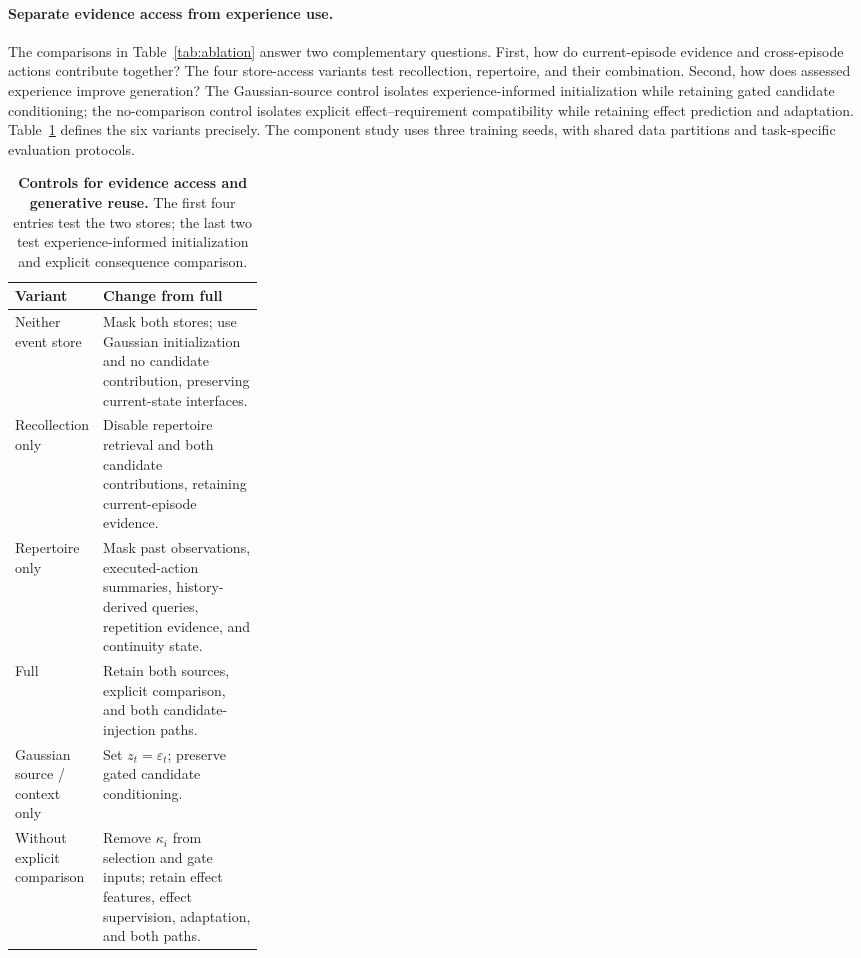 \paragraph{Separate evidence access from experience use.}
The comparisons in Table~\ref{tab:ablation} answer two complementary questions.
First, how do current-episode evidence and cross-episode actions contribute together?
The four store-access variants test recollection, repertoire, and their combination.
Second, how does assessed experience improve generation?
The Gaussian-source control isolates experience-informed initialization while retaining gated candidate conditioning; the no-comparison control isolates explicit effect--requirement compatibility while retaining effect prediction and adaptation.
Table~\ref{tab:app_ablation_defs} defines the six variants precisely.
The component study uses three training seeds, with shared data partitions and task-specific evaluation protocols.

\begin{table}[!htbp]
\centering\small
\caption{\textbf{Controls for evidence access and generative reuse.} The first four entries test the two stores; the last two test experience-informed initialization and explicit consequence comparison.}
\label{tab:app_ablation_defs}
\begin{tabularx}{\linewidth}{@{}p{0.29\linewidth}X@{}}
\toprule
Variant & Change from full \method{} \\
\midrule
Neither event store & Mask both stores; use Gaussian initialization and no candidate contribution, preserving current-state interfaces. \\
Recollection only & Disable repertoire retrieval and both candidate contributions, retaining current-episode evidence. \\
Repertoire only & Mask past observations, executed-action summaries, history-derived queries, repetition evidence, and continuity state. \\
Full \method{} & Retain both sources, explicit comparison, and both candidate-injection paths. \\
\midrule
Gaussian source / context only & Set $z_t=\varepsilon_t$; preserve gated candidate conditioning. \\
Without explicit comparison & Remove $\kappa_i$ from selection and gate inputs; retain effect features, effect supervision, adaptation, and both paths. \\
\bottomrule
\end{tabularx}
\end{table}

